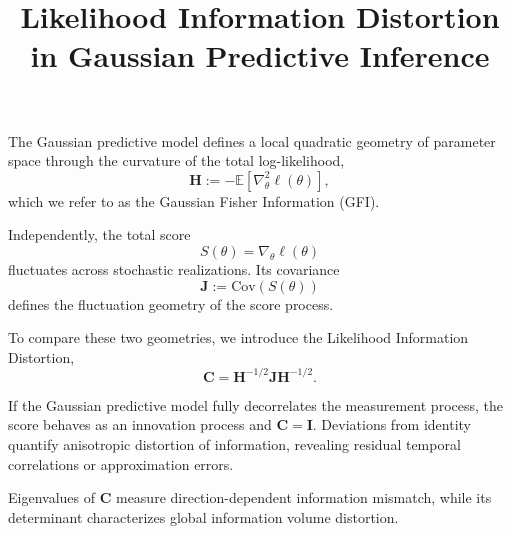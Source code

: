\documentclass[11pt]{article}
\title{Likelihood Information Distortion in Gaussian Predictive Inference}
\author{}
\date{}
\begin{document}
\maketitle

The Gaussian predictive model defines a local quadratic geometry of parameter space through the curvature of the total log-likelihood,
\begin{equation}
\mathbf H := -\mathbb{E}\!\left[\nabla^2_\theta \ell(\theta)\right],
\end{equation}
which we refer to as the Gaussian Fisher Information (GFI).

Independently, the total score
\begin{equation}
S(\theta) = \nabla_\theta \ell(\theta)
\end{equation}
fluctuates across stochastic realizations. Its covariance
\begin{equation}
\mathbf J := \mathrm{Cov}(S(\theta))
\end{equation}
defines the fluctuation geometry of the score process.

To compare these two geometries, we introduce the Likelihood Information Distortion,
\begin{equation}
\mathbf C = \mathbf H^{-1/2} \mathbf J \mathbf H^{-1/2}.
\end{equation}

If the Gaussian predictive model fully decorrelates the measurement process,
the score behaves as an innovation process and $\mathbf C = \mathbf I$.
Deviations from identity quantify anisotropic distortion of information,
revealing residual temporal correlations or approximation errors.

Eigenvalues of $\mathbf C$ measure direction-dependent information mismatch,
while its determinant characterizes global information volume distortion.
\end{document}
